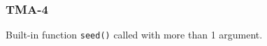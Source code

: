 \subsubsection{TMA-4}\label{sec:error_code_tma_4}

Built-in function \texttt{seed()} called with more than 1 argument.


